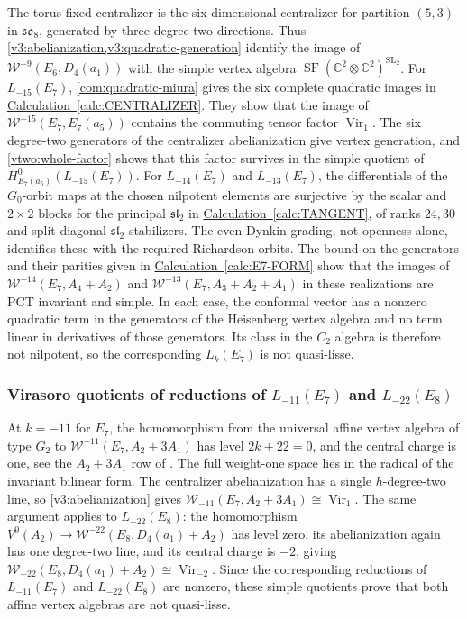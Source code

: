 \documentclass[11pt,a4paper]{amsart}
\numberwithin{equation}{section}
\theoremstyle{definition}
\theoremstyle{remark}
\newcommand{\C}{\mathbb C}
\newcommand{\sog}{\mathfrak{so}}
\newcommand{\slg}{\mathfrak{sl}}
\newcommand{\SF}{\operatorname{SF}}
\newcommand{\Vir}{\operatorname{Vir}}
\begin{document}
The torus-fixed centralizer is the six-dimensional centralizer for
partition $(5,3)$ in $\sog_8$, generated by three degree-two directions.
Thus \cref{v3:abelianization,v3:quadratic-generation} identify the
image of $\mathcal W^{-9}(E_6,D_4(a_1))$ with the simple vertex algebra
$\SF(\C^2\otimes\C^2)^{\mathrm{SL}_2}$.
For $L_{-15}(E_7)$, \cref{com:quadratic-miura} gives the six complete
quadratic images in \hyperref[calc:CENTRALIZER]{Calculation~\ref*{calc:CENTRALIZER}}.
They show that the image of $\mathcal W^{-15}(E_7,E_7(a_5))$
contains the commuting tensor factor $\Vir_1$. The six degree-two
generators of the centralizer abelianization give vertex generation,
and \cref{vtwo:whole-factor} shows that this factor survives in the
simple quotient of $H^0_{E_7(a_5)}(L_{-15}(E_7))$.
For $L_{-14}(E_7)$ and $L_{-13}(E_7)$, the differentials of the
$G_0$-orbit maps at the chosen nilpotent elements are surjective by
the scalar and $2\times2$ blocks for the principal $\slg_2$ in
\hyperref[calc:TANGENT]{Calculation~\ref*{calc:TANGENT}}, of ranks $24,30$ and split diagonal
$\slg_2$ stabilizers. The even Dynkin grading, not openness alone,
identifies these with the required Richardson orbits. The bound on the generators and their parities given in
\hyperref[calc:E7-FORM]{Calculation~\ref*{calc:E7-FORM}} show that the images of
$\mathcal W^{-14}(E_7,A_4+A_2)$ and
$\mathcal W^{-13}(E_7,A_3+A_2+A_1)$ in these realizations are PCT invariant
and simple. In each case, the conformal vector has a nonzero quadratic
term in the generators of the Heisenberg vertex algebra and no
term linear in derivatives of those generators. Its class in the $C_2$ algebra is therefore not
nilpotent, so the corresponding $L_k(E_7)$ is not quasi-lisse.

\subsubsection{\texorpdfstring{Virasoro quotients of reductions of $L_{-11}(E_7)$ and $L_{-22}(E_8)$}{Virasoro quotients of reductions of L-11(E7) and L-22(E8)}}
At $k=-11$ for $E_7$, the homomorphism from the universal affine
vertex algebra of type $G_2$ to $\mathcal W^{-11}(E_7,A_2+3A_1)$
has level $2k+22=0$, and the
central charge is one, see the $A_2+3A_1$ row of
\cite[arXiv v3, Table 8]{AdamovicEtAl2026}. The full weight-one space lies
in the radical of the invariant bilinear form.
The centralizer abelianization has a single $h$-degree-two line, so
\cref{v3:abelianization} gives
$\mathcal W_{-11}(E_7,A_2+3A_1)\cong\Vir_1$.
The same argument applies to $L_{-22}(E_8)$: the homomorphism
$V^0(A_2)\to\mathcal W^{-22}(E_8,D_4(a_1)+A_2)$ has level zero, its abelianization again has one degree-two line, and its central
charge is $-2$, giving
$\mathcal W_{-22}(E_8,D_4(a_1)+A_2)\cong\Vir_{-2}$.
Since the corresponding reductions of $L_{-11}(E_7)$ and $L_{-22}(E_8)$
are nonzero, these simple quotients prove that both affine vertex
algebras are not quasi-lisse.
\end{document}
